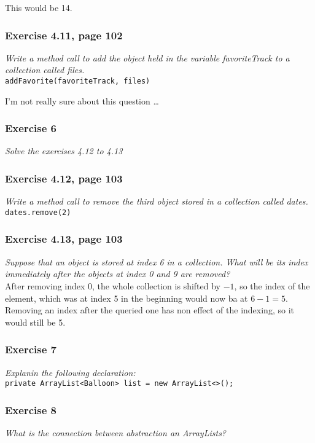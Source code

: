 This would be 14.

\subsubsection*{Exercise 4.11, page 102}
\textit{Write a method call to add the object held in the variable 
favoriteTrack to a collection called files.}\\

\lstinline{addFavorite(favoriteTrack, files)}

I'm not really sure about this question \dots

\subsubsection*{Exercise 6}
\textit{Solve the exercises 4.12 to 4.13}\\

\subsubsection*{Exercise 4.12, page 103}
\textit{Write a method call to remove the third object stored in a
collection called dates.}\\

\lstinline{dates.remove(2)}

\subsubsection*{Exercise 4.13, page 103}
\textit{Suppose that an object is stored at index 6 in a collection.
What will be its index immediately after the objects at index 0 and 9
are removed?}\\

After removing index 0, the whole collection is shifted by $-1$, 
so the index of the element, which was at index 5 in the beginning
would now ba at $6-1=5$. Removing an index after the queried one has
non effect of the indexing, so it would still be 5.

\subsubsection*{Exercise 7}
\textit{Explanin the following declaration:}\\
\lstinline?private ArrayList<Balloon> list = new ArrayList<>();?\\

\subsubsection*{Exercise 8}
\textit{What is the connection between abstraction an ArrayLists?}\\

